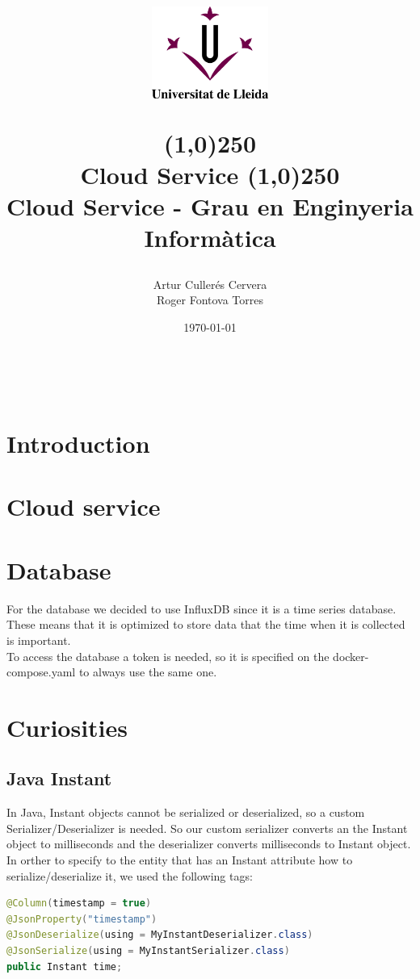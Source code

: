 \documentclass[12pt, letterpaper]{article}
\title{%
    \begin{center}
	\includegraphics[width=4cm,height=3cm]{udl.png}
    \end{center}
    \line(1,0){250}\\[0.3cm]
    \textbf{Cloud Service}
    \line(1,0){250}
    \\[0.5cm]
	\large Cloud Service - Grau en Enginyeria Informàtica
}
\author{Artur Cullerés Cervera \\ Roger Fontova Torres}
\date{\today}
\begin{document}
    
\maketitle
\thispagestyle{empty}
\newpage
\tableofcontents
\listoffigures
\newpage
\
\newpage


\section{Introduction}
\label{sections:introduction}


\section{Cloud service}
\label{sections:cloud-service}


\section{Database}
For the database we decided to use InfluxDB since it is a time series database. These means that it is optimized to store data that the time when it is collected is important. \\

To access the database a token is needed, so it is specified on the docker-compose.yaml to always use the same one.

\section{Curiosities}
\subsection{Java Instant}
In Java, Instant objects cannot be serialized or deserialized, so a custom Serializer/Deserializer is needed. So our custom serializer converts an the Instant object to milliseconds and the deserializer converts milliseconds to Instant object. In orther to specify to the entity that has an Instant attribute how to serialize/deserialize it, we used the following tags: \\

\begin{lstlisting}[language=java]
@Column(timestamp = true)
@JsonProperty("timestamp")
@JsonDeserialize(using = MyInstantDeserializer.class)
@JsonSerialize(using = MyInstantSerializer.class)
public Instant time;

\end{lstlisting}
\end{document}

